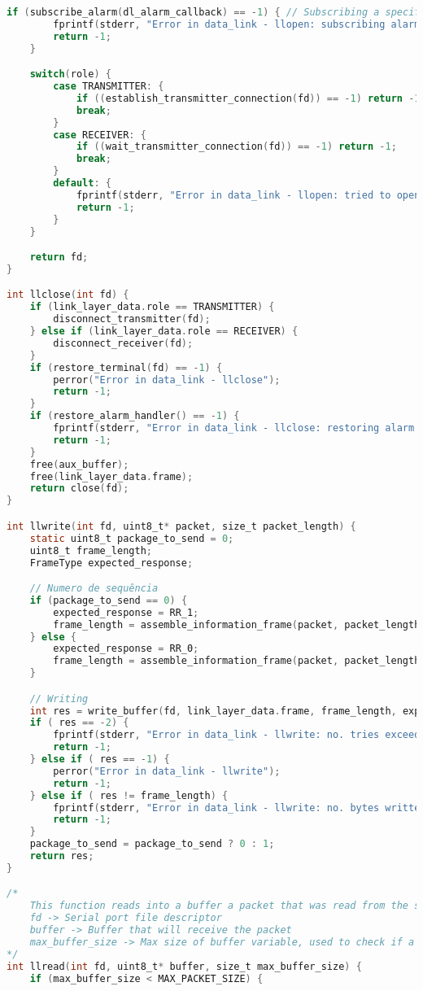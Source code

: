\begin{lstlisting}[language=C, caption=data_link.c]
    if (subscribe_alarm(dl_alarm_callback) == -1) { // Subscribing a specific function to be called in alarm
        fprintf(stderr, "Error in data_link - llopen: subscribing alarm event\n");
        return -1;
    }

    switch(role) {
        case TRANSMITTER: {
            if ((establish_transmitter_connection(fd)) == -1) return -1;
            break;
        }
        case RECEIVER: {
            if ((wait_transmitter_connection(fd)) == -1) return -1;
            break;
        }
        default: {
            fprintf(stderr, "Error in data_link - llopen: tried to open a connection with invalid role\n");
            return -1;
        }
    }

    return fd;   
}

int llclose(int fd) {
    if (link_layer_data.role == TRANSMITTER) {
        disconnect_transmitter(fd);
    } else if (link_layer_data.role == RECEIVER) {
        disconnect_receiver(fd);
    }
    if (restore_terminal(fd) == -1) {
        perror("Error in data_link - llclose");
        return -1;
    }
    if (restore_alarm_handler() == -1) {
        fprintf(stderr, "Error in data_link - llclose: restoring alarm handlers\n");
        return -1;
    }
    free(aux_buffer);
    free(link_layer_data.frame);
    return close(fd);
}

int llwrite(int fd, uint8_t* packet, size_t packet_length) {
    static uint8_t package_to_send = 0;
    uint8_t frame_length;
    FrameType expected_response;

    // Numero de sequência
    if (package_to_send == 0) {
        expected_response = RR_1;
        frame_length = assemble_information_frame(packet, packet_length, link_layer_data.frame, 0);
    } else {
        expected_response = RR_0;
        frame_length = assemble_information_frame(packet, packet_length, link_layer_data.frame, 1);
    }

    // Writing
    int res = write_buffer(fd, link_layer_data.frame, frame_length, expected_response);
    if ( res == -2) {
        fprintf(stderr, "Error in data_link - llwrite: no. tries exceeded\n");
        return -1;
    } else if ( res == -1) {
        perror("Error in data_link - llwrite");
        return -1;
    } else if ( res != frame_length) {
        fprintf(stderr, "Error in data_link - llwrite: no. bytes written not matching expected\n");
        return -1;
    }
    package_to_send = package_to_send ? 0 : 1;
    return res;
}

/*
    This function reads into a buffer a packet that was read from the serial port
    fd -> Serial port file descriptor
    buffer -> Buffer that will receive the packet
    max_buffer_size -> Max size of buffer variable, used to check if a packet can fit into the provided buffer
*/
int llread(int fd, uint8_t* buffer, size_t max_buffer_size) {
    if (max_buffer_size < MAX_PACKET_SIZE) {


\end{lstlisting}
